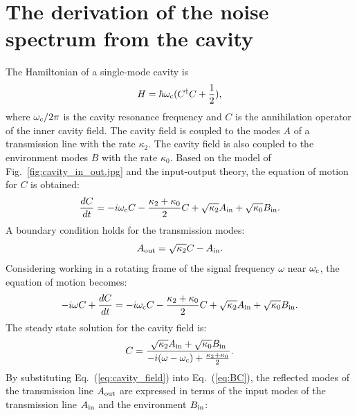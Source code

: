\section{The derivation of the noise spectrum from the cavity} 
\label{sec:cavitynoise}

The Hamiltonian of a single-mode cavity is
\begin{equation}
\label{eq:cavity_Hamiltonian}
    H = \hbar \omega_{\rm c}(C^{\dagger}C+\frac{1}{2}),
\end{equation}
where $\omega_{\rm c}/2\pi$ is the cavity resonance frequency and $C$ is the 
annihilation operator of the inner cavity field. The cavity field is coupled 
to the modes $A$ of a transmission line with the rate $\kappa_2$. The cavity 
field is also coupled to the environment modes $B$ with the rate $\kappa_0$. 
Based on the model of Fig.~\ref{fig:cavity_in_out.jpg} and the input-output 
theory, the equation of motion for $C$ is obtained:
\begin{equation}
\label{eq:EOM}
    \frac{dC}{dt} = -i\omega_{\rm c} C - \frac{\kappa_2+\kappa_0}{2} C + \sqrt{\kappa_2} A_{\rm in} + \sqrt{\kappa_0}B_{\rm in}.
\end{equation}
A boundary condition holds for the transmission modes:
\begin{equation}
\label{eq:BC}
    A_{\rm out} = \sqrt{\kappa_2} C - A_{\rm in}.
\end{equation}
Considering working in a rotating frame of the signal frequency $\omega$ near 
$\omega_{\rm c}$, the equation of motion becomes:
\begin{equation}
\label{eq:EOM_rotating_frame}
    -i\omega C + \frac{dC}{dt} = -i \omega_{\rm c} C - \frac{\kappa_2+\kappa_0}{2} C + \sqrt{\kappa_2} A_{\rm in} + \sqrt{\kappa_0} B_{\rm in}.
\end{equation}
The steady state solution for the cavity field is: 
\begin{equation}
\label{eq:cavity_field}
    C = \frac {\sqrt{\kappa_2} A_{\rm in} + \sqrt{\kappa_0} B_{\rm in}} {-i (\omega-\omega_{\rm c}) + \frac{\kappa_2+\kappa_0}{2} }.
\end{equation}
By substituting Eq.~(\ref{eq:cavity_field}) into Eq.~(\ref{eq:BC}), the 
reflected modes of the transmission line $A_{\rm out}$ are expressed in terms 
of the input modes of the transmission line $A_{\rm in}$ and the environment 
$B_{\rm in}$:
